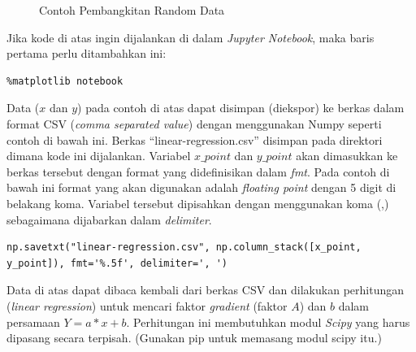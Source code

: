 \begin{figure}[ht]
\caption{Contoh Pembangkitan Random Data}
\label{fig:randomnumpy}
\end{figure}

Jika kode di atas ingin dijalankan di dalam {\em Jupyter Notebook},
maka baris pertama perlu ditambahkan ini:

\begin{verbatim}
%matplotlib notebook
\end{verbatim}

Data ($x$ dan $y$) pada contoh di atas dapat disimpan (diekspor) ke berkas
dalam format CSV ({\em comma separated value}) dengan menggunakan Numpy
seperti contoh di bawah ini.
Berkas ``linear-regression.csv'' disimpan pada direktori dimana kode
ini dijalankan. Variabel $x\_point$ dan $y\_point$ akan dimasukkan ke
berkas tersebut dengan format yang didefinisikan dalam {\em fmt}.
Pada contoh di bawah ini format yang akan digunakan adalah 
{\em floating point} dengan 5 digit di belakang koma.
Variabel tersebut dipisahkan dengan menggunakan koma (,) sebagaimana
dijabarkan dalam {\em delimiter}.

\begin{verbatim}
np.savetxt("linear-regression.csv", np.column_stack([x_point, y_point]), fmt='%.5f', delimiter=', ')
\end{verbatim}

Data di atas dapat dibaca kembali dari berkas CSV dan dilakukan
perhitungan ({\em linear regression}) untuk mencari faktor {\em gradient}
(faktor $A$) dan $b$ dalam persamaan $Y = a*x + b$.
Perhitungan ini membutuhkan modul {\em Scipy} yang harus dipasang
secara terpisah. (Gunakan pip untuk memasang modul scipy itu.)

